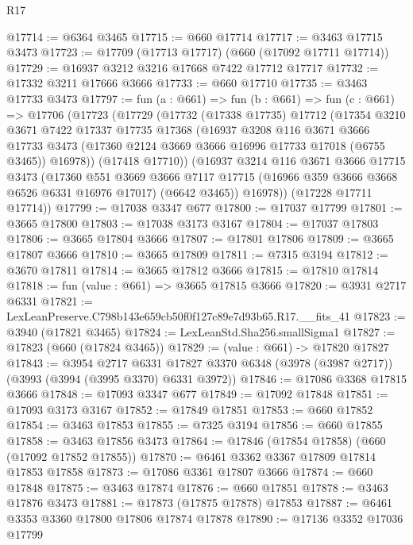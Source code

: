 \begin{lexlean}{R17}
\begin{coremodule}
@17714 := @6364 @3465
@17715 := @660 @17714
@17717 := @3463 @17715 @3473
@17723 := @17709 (@17713 @17717) (@660 (@17092 @17711 @17714))
@17729 := @16937 @3212 @3216 @17668 @7422 @17712 @17717
@17732 := @17332 @3211 @17666 @3666
@17733 := @660 @17710
@17735 := @3463 @17733 @3473
@17797 := fun (a : @661) =>
  fun (b : @661) =>
  fun (c : @661) =>
  @17706
    (@17723
      (@17729
        (@17732
          (@17338 @17735)
          @17712
          (@17354
            @3210
            @3671
            @7422
            @17337
            @17735
            @17368
            (@16937
              @3208
              @116
              @3671
              @3666
              @17733
              @3473
              (@17360 @2124 @3669 @3666 @16996 @17733 @17018 (@6755 @3465))
              @16978))
          (@17418 @17710))
        (@16937
          @3214
          @116
          @3671
          @3666
          @17715
          @3473
          (@17360
            @551
            @3669
            @3666
            @7117
            @17715
            (@16966 @359 @3666 @3668 @6526 @6331 @16976 @17017)
            (@6642 @3465))
          @16978))
      (@17228 @17711 @17714))
@17799 := @17038 @3347 @677
@17800 := @17037 @17799
@17801 := @3665 @17800
@17803 := @17038 @3173 @3167
@17804 := @17037 @17803
@17806 := @3665 @17804 @3666
@17807 := @17801 @17806
@17809 := @3665 @17807 @3666
@17810 := @3665 @17809
@17811 := @7315 @3194
@17812 := @3670 @17811
@17814 := @3665 @17812 @3666
@17815 := @17810 @17814
@17818 := fun (value : @661) => @3665 @17815 @3666
@17820 := @3931 @2717 @6331
@17821 := LexLeanPreserve.C798b143e659cb50f0f127c89e7d93b65.R17.__fits_41
@17823 := @3940 (@17821 @3465)
@17824 := LexLeanStd.Sha256.smallSigma1
@17827 := @17823 (@660 (@17824 @3465))
@17829 := (value : @661) -> @17820 @17827
@17843 := @3954
    @2717
    @6331
    @17827
    @3370
    @6348
    (@3978 (@3987 @2717))
    (@3993 (@3994 (@3995 @3370) @6331 @3972))
@17846 := @17086 @3368 @17815 @3666
@17848 := @17093 @3347 @677
@17849 := @17092 @17848
@17851 := @17093 @3173 @3167
@17852 := @17849 @17851
@17853 := @660 @17852
@17854 := @3463 @17853
@17855 := @7325 @3194
@17856 := @660 @17855
@17858 := @3463 @17856 @3473
@17864 := @17846 (@17854 @17858) (@660 (@17092 @17852 @17855))
@17870 := @6461 @3362 @3367 @17809 @17814 @17853 @17858
@17873 := @17086 @3361 @17807 @3666
@17874 := @660 @17848
@17875 := @3463 @17874
@17876 := @660 @17851
@17878 := @3463 @17876 @3473
@17881 := @17873 (@17875 @17878) @17853
@17887 := @6461 @3353 @3360 @17800 @17806 @17874 @17878
@17890 := @17136 @3352 @17036 @17799

\end{coremodule}
\end{lexlean}
